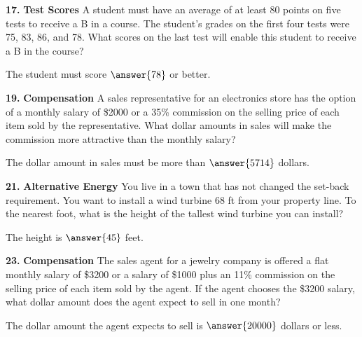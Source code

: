 \documentclass{ximera}
\begin{document}
\begin{problem}
\textbf{17.} \textbf{Test Scores} A student must have an average of at least 80 points on five
  tests to receive a B in a course. The student's grades on the first four tests were 75,
  83, 86, and 78. What scores on the last test will enable this student to receive a B in
  the course?

The student must score \(\answer{78} \) or better.
\end{problem}

\begin{problem}
\textbf{19.} \textbf{Compensation} A sales representative for an electronics store has the
  option of a monthly salary of \$2000 or a 35\% commission on the selling price of each
  item sold by the representative. What dollar amounts in sales will make the commission
  more attractive than the monthly salary?

The dollar amount in sales must be more than \(  \answer{5714} \) dollars.
\end{problem}

\begin{problem}
\textbf{21.} \textbf{Alternative Energy} You live in a town that has not changed the set-back
  requirement. You want to install a wind turbine 68 ft from your property line. To the
  nearest foot, what is the height of the tallest wind turbine you can install?

The height is \( \answer{45} \) feet.
\end{problem}

\begin{problem}
\textbf{23.} \textbf{Compensation} The sales agent for a jewelry company is offered a flat
  monthly salary of \$3200 or a salary of \$1000 plus an 11\% commission on the selling
  price of each item sold by the agent. If the agent chooses the \$3200 salary, what
  dollar amount does the agent expect to sell in one month?

The dollar amount the agent expects to sell is \( \answer{20000} \) dollars or less.
\end{problem}
\end{document}
